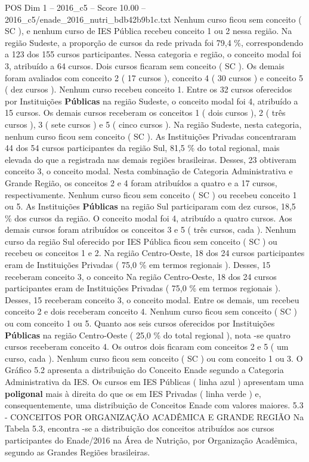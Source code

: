 \begin{textsample}{POS Dim 1 – 2016\_c5 – Score 10.00 – 2016\_c5/enade\_2016\_nutri\_bdb42b9b1c.txt}
Nenhum curso ficou sem conceito ( SC ), e nenhum curso de IES Pública recebeu conceito 1 ou 2 nessa região.
Na região Sudeste, a proporção de cursos da rede privada foi 79,4 \%, correspondendo a 123 dos 155 cursos participantes.
Nessa categoria e região, o conceito modal foi 3, atribuído a 64 cursos.
Dois cursos ficaram sem conceito ( SC ).
Os demais foram avaliados com conceito 2 ( 17 cursos ), conceito 4 ( 30 cursos ) e conceito 5 ( dez cursos ).
Nenhum curso recebeu conceito 1.
Entre os 32 cursos oferecidos por Instituições \textbf{Públicas} na região Sudeste, o conceito modal foi 4, atribuído a 15 cursos.
Os demais cursos receberam os conceitos 1 ( dois cursos ), 2 ( três cursos ), 3 ( sete cursos ) e 5 ( cinco cursos ).
Na região Sudeste, nesta categoria, nenhum curso ficou sem conceito ( SC ).
As Instituições Privadas concentraram 44 dos 54 cursos participantes da região Sul, 81,5 \% do total regional, mais elevada do que a registrada nas demais regiões brasileiras.
Desses, 23 obtiveram conceito 3, o conceito modal.
Nesta combinação de Categoria Administrativa e Grande Região, os conceitos 2 e 4 foram atribuídos a quatro e a 17 cursos, respectivamente.
Nenhum curso ficou sem conceito ( SC ) ou recebeu conceito 1 ou 5.
As Instituições \textbf{Públicas} na região Sul participaram com dez cursos, 18,5 \% dos cursos da região.
O conceito modal foi 4, atribuído a quatro cursos.
Aos demais cursos foram atribuídos os conceitos 3 e 5 ( três cursos, cada ).
Nenhum curso da região Sul oferecido por IES Pública ficou sem conceito ( SC ) ou recebeu os conceitos 1 e 2.
Na região Centro-Oeste, 18 dos 24 cursos participantes eram de Instituições Privadas ( 75,0 \% em termos regionais ).
Desses, 15 receberam conceito 3, o conceito Na região Centro-Oeste, 18 dos 24 cursos participantes eram de Instituições Privadas ( 75,0 \% em termos regionais ).
Desses, 15 receberam conceito 3, o conceito modal.
Entre os demais, um recebeu conceito 2 e dois receberam conceito 4.
Nenhum curso ficou sem conceito ( SC ) ou com conceito 1 ou 5.
Quanto aos seis cursos oferecidos por Instituições \textbf{Públicas} na região Centro-Oeste ( 25,0 \% do total regional ), nota -se quatro cursos receberam conceito 4.
Os outros dois ficaram com conceitos 2 e 5 ( um curso, cada ).
Nenhum curso ficou sem conceito ( SC ) ou com conceito 1 ou 3.
O Gráfico 5.2 apresenta a distribuição do Conceito Enade segundo a Categoria Administrativa da IES.
Os cursos em IES Públicas ( linha azul ) apresentam uma \textbf{poligonal} mais à direita do que os em IES Privadas ( linha verde ) e, consequentemente, uma distribuição de Conceitos Enade com valores maiores. 5.3 - CONCEITOS POR ORGANIZAÇÃO ACADÊMICA E GRANDE REGIÃO Na Tabela 5.3, encontra -se a distribuição dos conceitos atribuídos aos cursos participantes do Enade/2016 na Área de Nutrição, por Organização Acadêmica, segundo as Grandes Regiões brasileiras.

\end{textsample}
